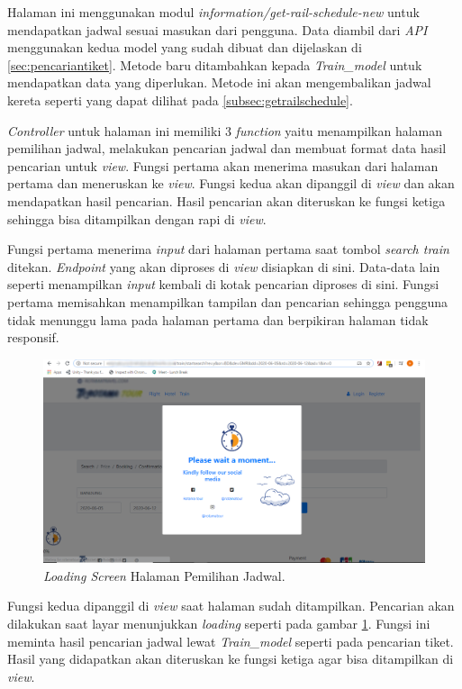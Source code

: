 Halaman ini menggunakan modul \textit{information/get-rail-schedule-new} untuk mendapatkan jadwal sesuai masukan dari pengguna. Data diambil dari \textit{API} menggunakan kedua model yang sudah dibuat dan dijelaskan di \ref{sec:pencariantiket}. Metode baru ditambahkan kepada \textit{Train\_model} untuk mendapatkan data yang diperlukan. Metode ini akan mengembalikan jadwal kereta seperti yang dapat dilihat pada \ref{subsec:getrailschedule}.

\textit{Controller} untuk halaman ini memiliki 3 \textit{function} yaitu menampilkan halaman pemilihan jadwal, melakukan pencarian jadwal dan membuat format data hasil pencarian untuk \textit{view}. Fungsi pertama akan menerima masukan dari halaman pertama dan meneruskan ke \textit{view}. Fungsi kedua akan dipanggil di \textit{view} dan akan mendapatkan hasil pencarian. Hasil pencarian akan diteruskan ke fungsi ketiga sehingga bisa ditampilkan dengan rapi di \textit{view}.

Fungsi pertama menerima \textit{input} dari halaman pertama saat tombol \textit{search train} ditekan. \textit{Endpoint} yang akan diproses di \textit{view} disiapkan di sini. Data-data lain seperti menampilkan \textit{input} kembali di kotak pencarian diproses di sini. Fungsi pertama memisahkan menampilkan tampilan dan pencarian sehingga pengguna tidak menunggu lama pada halaman pertama dan berpikiran halaman tidak responsif.

\begin{figure}[H]
        \center
        \includegraphics[width=\textwidth,height=\textheight,keepaspectratio]{Gambar/Loading pilih jadwal.png}
        \caption{\textit{Loading Screen} Halaman Pemilihan Jadwal.}
            \label{img:loadingpilihjadwal}
        \end{figure}

Fungsi kedua dipanggil di \textit{view} saat halaman sudah ditampilkan. Pencarian akan dilakukan saat layar menunjukkan \textit{loading} seperti pada gambar \ref{img:loadingpilihjadwal}. Fungsi ini meminta hasil pencarian jadwal lewat \textit{Train\_model} seperti pada pencarian tiket. Hasil yang didapatkan akan diteruskan ke fungsi ketiga agar bisa ditampilkan di \textit{view}.

